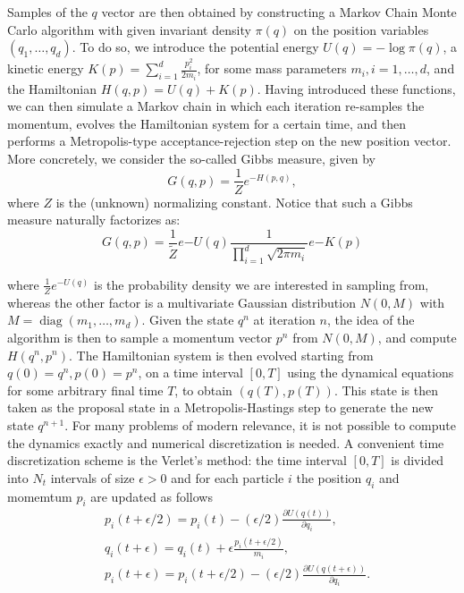 \documentclass[a4paper, 12pt,oneside]{article}
\begin{document}
			Samples of the $q$ vector are then obtained by constructing a Markov Chain Monte Carlo algorithm with given invariant density $\pi(q)$ on the position variables $\left(q_1, \ldots, q_d\right)$. To do so, we introduce the potential energy $U(q)=-\log \pi(q)$, a kinetic energy $K(p)=\sum_{i=1}^d \frac{p_i^2}{2 m_i}$, for some mass parameters $m_i, i=1, \ldots, d$, and the Hamiltonian $H(q, p)=U(q)+K(p)$. Having introduced these functions, we can then simulate a Markov chain in which each iteration re-samples the momentum, evolves the Hamiltonian system for a certain time, and then performs a Metropolis-type acceptance-rejection step on the new position vector. More concretely, we consider the so-called Gibbs measure, given by
			$$
			G(q, p)=\frac{1}{Z} e^{-H(p, q)},
			$$
			where $Z$ is the (unknown) normalizing constant. Notice that such a Gibbs measure naturally factorizes as:
			$$
			G(q, p)=\frac{1}{\tilde{Z}} e{-U(q)} \frac{1}{\prod_{i=1}^d \sqrt{2 \pi m_i}} e{-K(p)}
			$$
			
			where $\frac{1}{Z} e^{-U(q)}$ is the probability density we are interested in sampling from, whereas the other factor is a multivariate Gaussian distribution $N(0, M)$ with $M=\operatorname{diag}\left(m_1, \ldots, m_d\right)$. Given the state $q^n$ at iteration $n$, the idea of the algorithm is then to sample a momentum vector $p^n$ from $N(0, M)$, and compute $H\left(q^n, p^n\right)$. The Hamiltonian system is then evolved starting from $q(0)=q^n, p(0)=p^n$, on a time interval $[0,T]$ using the dynamical equations for some arbitrary final time $T$, to obtain $(q(T), p(T))$. This state is then taken as the proposal state in a Metropolis-Hastings step to generate the new state $q^{n+1}$. For many problems of modern relevance, it is not possible to compute the dynamics exactly and numerical discretization is needed. A convenient time discretization scheme is the Verlet's method: the time interval $[0, T]$ is divided into $N_t$ intervals of size $\epsilon>0$ and for each particle $i$ the position $q_i$ and momemtum $p_i$ are updated as follows			
			\begin{align}
			& p_i(t+\epsilon / 2)=p_i(t)-(\epsilon / 2) \frac{\partial U(q(t))}{\partial q_i}, \\
			& q_i(t+\epsilon)=q_i(t)+\epsilon \frac{p_i(t+\epsilon / 2)}{m_i}, \\
			& p_i(t+\epsilon)=p_i(t+\epsilon / 2)-(\epsilon / 2) \frac{\partial U(q(t+\epsilon))}{\partial q_i}.
			\end{align}	
\end{document}
